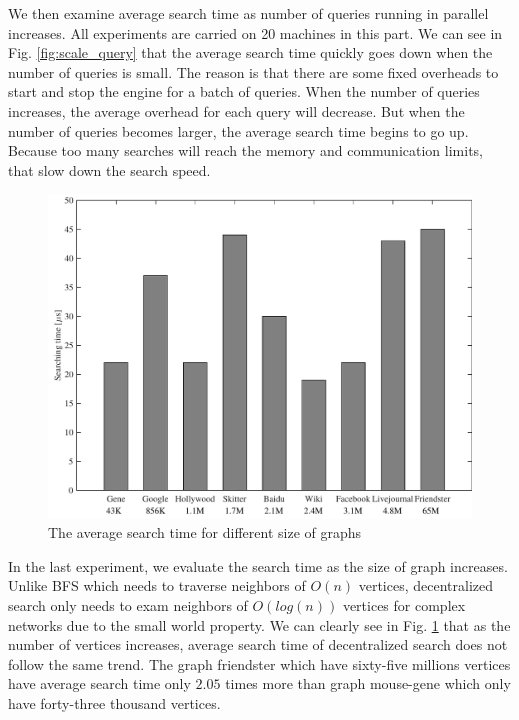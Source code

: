 We then examine average search time as number of queries running in parallel increases. All experiments are carried on 20 machines in this part. We can see in Fig. \ref{fig:scale_query} that the average search time quickly goes down when the number of queries is small. The reason is that there are some fixed overheads to start and stop the engine for a batch of queries. When the number of queries increases, the average overhead for each query will decrease. But when the number of queries becomes larger, the average search time begins to go up.  Because too many searches will reach the memory and communication limits, that slow down the search speed.

\begin{figure}[t]
    \centering
    \includegraphics[width=\linewidth]{./figures/scale_graph.pdf}
    \caption{The average search time for different size of graphs}
    \label{fig:scale_graph}
\end{figure}

In the last experiment, we evaluate the search time as the size of graph increases. Unlike BFS which needs to traverse neighbors of $O(n)$ vertices, decentralized search only needs to exam neighbors of $O(log(n))$ vertices for complex networks due to the small world property. We can clearly see in Fig. \ref{fig:scale_graph} that as the number of vertices increases, average search time of decentralized search does not follow the same trend. The graph friendster which have sixty-five millions vertices have average search time only $2.05$ times more than graph mouse-gene which only have forty-three thousand vertices.

%
%
